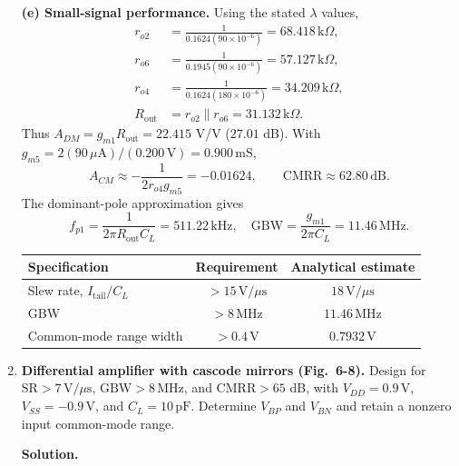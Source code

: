 \documentclass[12pt,letterpaper]{article}
\newcommand{\uA}{\,\mu\mathrm{A}}
\newcommand{\mS}{\,\mathrm{mS}}
\newcommand{\kohm}{\,\mathrm{k}\Omega}
\newcommand{\V}{\,\mathrm{V}}
\newcommand{\MHz}{\,\mathrm{MHz}}
\newcommand{\Vus}{\,\mathrm{V}/\mu\mathrm{s}}
\begin{document}
\begin{enumerate}
\textbf{(e) Small-signal performance.}
Using the stated $\lambda$ values,
\begin{align*}
r_{o2}&=\frac{1}{0.1624(90\times10^{-6})}=68.418\kohm,\\
r_{o6}&=\frac{1}{0.1945(90\times10^{-6})}=57.127\kohm,\\
r_{o4}&=\frac{1}{0.1624(180\times10^{-6})}=34.209\kohm,\\
R_{\mathrm{out}}&=r_{o2}\parallel r_{o6}=31.132\kohm.
\end{align*}
Thus $A_{DM}=g_{m1}R_{\mathrm{out}}=22.415$ V/V
($27.01$ dB). With $g_{m5}=2(90\uA)/(0.200\V)=0.900\mS$,
\[
A_{CM}\approx-\frac{1}{2r_{o4}g_{m5}}=-0.01624,\qquad
\mathrm{CMRR}\approx62.80\,\mathrm{dB}.
\]
The dominant-pole approximation gives
\[
f_{p1}=\frac{1}{2\pi R_{\mathrm{out}}C_L}=511.22\,\mathrm{kHz},\quad
\mathrm{GBW}=\frac{g_{m1}}{2\pi C_L}=11.46\MHz.
\]
\begin{center}
\small
\begin{tabular}{@{}lcc@{}}
\toprule
Specification & Requirement & Analytical estimate\\
\midrule
Slew rate, $I_{\mathrm{tail}}/C_L$ & $>15\Vus$ & $18\Vus$\\
GBW & $>8\MHz$ & $11.46\MHz$\\
Common-mode range width & $>0.4\V$ & $0.7932\V$\\
\bottomrule
\end{tabular}
\end{center}
\newpage
\item \textbf{Differential amplifier with cascode mirrors (Fig.~6-8).}
Design for $\mathrm{SR}>7\Vus$, $\mathrm{GBW}>8\MHz$, and
$\mathrm{CMRR}>65$ dB, with $V_{DD}=0.9\V$,
$V_{SS}=-0.9\V$, and $C_L=10\,\mathrm{pF}$.
Determine $V_{BP}$ and $V_{BN}$ and retain a nonzero input
common-mode range.

\textbf{Solution.}


\end{enumerate}
\end{document}
